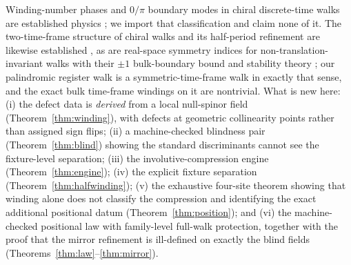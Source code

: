 \documentclass[11pt]{article}
\begin{document}
Winding-number phases and $0/\pi$ boundary modes in chiral discrete-time
walks are established physics \cite{Kitagawa,Asboth,AsbothObuse,Cedzich};
we import that classification and claim none of it.  The two-time-frame
structure of chiral walks and its half-period refinement are likewise
established \cite{AsbothObuse,CGWW}, as are real-space symmetry indices for
non-translation-invariant walks with their $\pm1$ bulk-boundary bound and
stability theory \cite{Cedzich,CedzichBulkEdge,CedzichHomotopy}; our
palindromic register walk is a symmetric-time-frame walk in exactly that
sense, and the exact bulk time-frame windings on it are nontrivial.  What
is new here:
(i) the defect data is \emph{derived} from a local null-spinor field
(Theorem~\ref{thm:winding}), with defects at geometric collinearity points
rather than assigned sign flips; (ii) a machine-checked blindness pair
(Theorem~\ref{thm:blind}) showing the standard discriminants cannot see
the fixture-level separation; (iii) the involutive-compression engine
(Theorem~\ref{thm:engine}); (iv) the explicit fixture separation
(Theorem~\ref{thm:halfwinding}); (v) the exhaustive four-site theorem
showing that winding alone does not classify the compression and identifying
the exact additional positional datum (Theorem~\ref{thm:position}); and
(vi) the machine-checked positional law with family-level full-walk
protection, together with the proof that the mirror refinement is
ill-defined on exactly the blind fields
(Theorems~\ref{thm:law}--\ref{thm:mirror}).
\end{document}
